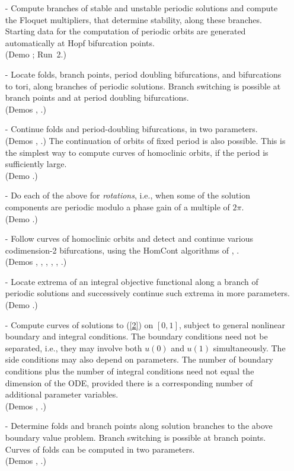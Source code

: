 \begin{itemize}
\item[-]
  Compute branches of stable and unstable periodic
  solutions and
  compute the Floquet multipliers, that determine stability, along
  these branches.
  Starting data for the computation of periodic orbits are
  generated automatically at Hopf bifurcation points. \\
  (Demo ; Run~2.)
\item[-]
  Locate folds, branch points, period doubling bifurcations,
  and bifurcations to tori, along branches of periodic solutions. 
  Branch switching is possible at branch points and at period 
  doubling bifurcations.  \\
  (Demos , .)
\item[-]  Continue folds and period-doubling bifurcations, 
  in two parameters. \\ (Demos , .)
  The continuation of orbits of fixed period is also
  possible. This is the simplest way to compute curves of
  homoclinic orbits, if the period is sufficiently large.
  \\ (Demo .)
\item[-]  Do each of the above for {\it rotations}, i.e., when some of the
  solution components are periodic modulo a phase gain of a
  multiple of $2 \pi$. \\
  (Demo .)
\item[-]  Follow curves of homoclinic orbits and detect and continue
  various codimension-2 bifurcations, using the {\cal HomCont} algorithms of 
   \citeyear{ChKu:94},
   \citeyear{ChKuSa:95}.\\
  (Demos  , , , ,
  , .)
\item[-]  Locate extrema of an integral objective functional along a branch 
  of periodic solutions and successively continue such extrema 
  in more parameters. \\
  (Demo .)
\item[-]
  Compute curves of solutions to (\ref{2}) on $[0,1]$, subject to general
  nonlinear boundary and integral conditions.
  The boundary conditions need not be separated, i.e., they may
  involve both $u(0)$ and $u(1)$ simultaneously.
  The side conditions may also depend on parameters.
  The number of boundary conditions plus the number of integral
  conditions need not equal the dimension of the ODE, 
  provided there is a corresponding number of additional
  parameter variables. \\
  (Demos , .)
\item[-]
  Determine folds and branch points along
  solution branches to the above boundary value problem.
  Branch switching is possible at branch points.
  Curves of folds can be computed in two parameters.\\
  (Demos , .)
\end{itemize}
 


